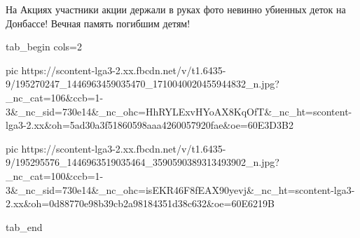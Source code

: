На Акциях участники акции держали в руках фото невинно убиенных  деток на
Донбассе! Вечная память погибшим детям!


\ifcmt
  tab_begin cols=2

     pic https://scontent-lga3-2.xx.fbcdn.net/v/t1.6435-9/195270247_1446963459035470_1710040020455944832_n.jpg?_nc_cat=106&ccb=1-3&_nc_sid=730e14&_nc_ohc=HhRYLExvHYoAX8KqOfT&_nc_ht=scontent-lga3-2.xx&oh=5ad30a3f51860598aaa4260057920fae&oe=60E3D3B2

     pic https://scontent-lga3-2.xx.fbcdn.net/v/t1.6435-9/195295576_1446963519035464_3590590389313493902_n.jpg?_nc_cat=100&ccb=1-3&_nc_sid=730e14&_nc_ohc=isEKR46F8fEAX90yevj&_nc_ht=scontent-lga3-2.xx&oh=0d88770e98b39cb2a98184351d38c632&oe=60E6219B

  tab_end
\fi

